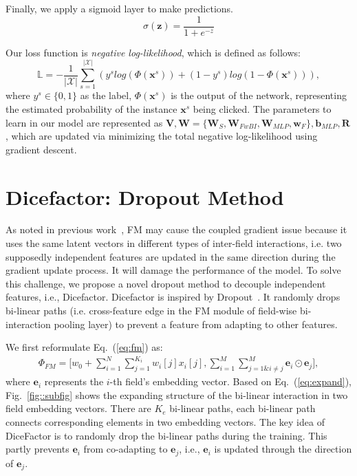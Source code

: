 \documentclass[sigconf]{acmart}
\begin{document}
Finally, we apply a sigmoid layer to make predictions. 
\begin{equation}
	\sigma(\mathbf{z}) = \frac{1}{1+e^{-z}} 
\end{equation}

Our loss function is \textit{negative log-likelihood}, which is defined as follows:
\begin{equation}\label{eqa::loss}
\mathbb{L} = -\frac{1}{|\mathcal{X}|} \sum_{s=1}^{|\mathcal{X}|} (y^s log(\Phi(\mathbf{x}^s))+(1-y^s)log(1-\Phi(\mathbf{x}^s))),
\end{equation}
where $y^s \in \{0, 1\}$ as the label, $\Phi(\mathbf{x}^s)$ is the output of the network, representing the estimated probability of the instance $\mathbf{x}^s$ being clicked. The parameters to learn in our model are represented as $\mathbf{V}, \mathbf{W}=\{\mathbf{W}_{S},\mathbf{W}_{FwBI},\mathbf{W}_{MLP},\mathbf{w}_F\},\mathbf{b}_{MLP},\mathbf{R}$, which are updated via minimizing the total negative log-likelihood using gradient descent.


\section{Dicefactor: Dropout Method}
As noted in previous work~\citep{qu2018product}, FM may cause the coupled gradient issue because it uses the same latent vectors in different types of inter-field interactions, i.e.  two supposedly independent features are updated in the same direction during the gradient update process. It will damage the performance of the model. To solve this challenge, we propose a novel dropout method to decouple independent features, i.e., Dicefactor. 
Dicefactor is inspired by Dropout~\citep{srivastava2014dropout}. It randomly drops bi-linear paths (i.e. cross-feature edge in the FM module of field-wise bi-interaction pooling layer) to prevent a feature from adapting to other features. 

We first reformulate Eq.~(\ref{eq:fm}) as:
\begin{equation}\label{eq:expand}
\begin{aligned}
\Phi_{FM}=\Big[w_0 + \sum_{i=1}^{N}\sum_{j=1}^{K_i} w_{i}[j] x_{i}[j], \sum_{i=1}^M \sum_{j=1\& i \neq j}^M \mathbf{e}_i\odot \mathbf{e}_j\Big], 
\end{aligned}
\end{equation}
where $\mathbf{e}_i$ represents the $i$-th field's embedding vector. Based on Eq.~(\ref{eq:expand}), Fig.~\ref{fig::subfig} shows the expanding structure of the bi-linear interaction in two field embedding vectors. There are $K_{e}$ bi-linear paths, each bi-linear path connects corresponding elements in two embedding vectors. The key idea of DiceFactor is to randomly drop the bi-linear paths during the training. This partly prevents $\mathbf{e}_i$ from co-adapting to $\mathbf{e}_j$, i.e., $\mathbf{e}_i$ is updated through the direction of $\mathbf{e}_j$. 
\end{document}
